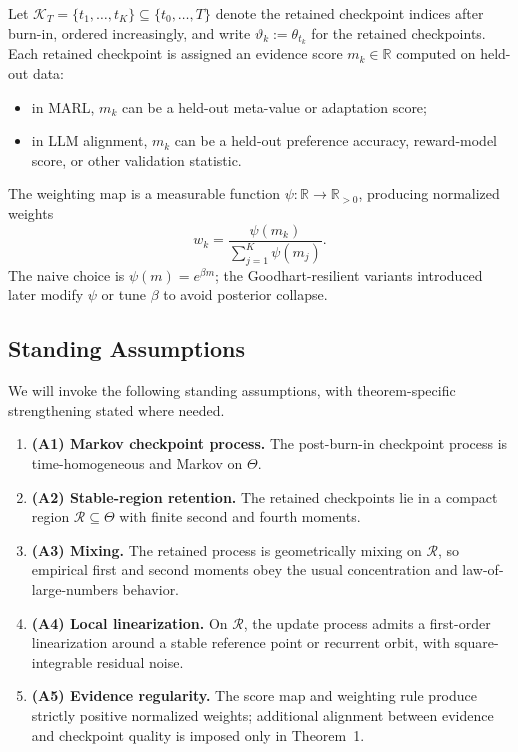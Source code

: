 \documentclass[10pt]{article}
\theoremstyle{plain}
\theoremstyle{definition}
\theoremstyle{remark}
\begin{document}
Let $\mathcal{K}_T = \{t_1,\dots,t_K\} \subseteq \{t_0,\dots,T\}$ denote the retained checkpoint indices after burn-in, ordered increasingly, and write $\vartheta_k := \theta_{t_k}$ for the retained checkpoints. Each retained checkpoint is assigned an evidence score $m_k \in \mathbb{R}$ computed on held-out data:
\begin{itemize}[leftmargin=1.5em]
  \item in MARL, $m_k$ can be a held-out meta-value or adaptation score;
  \item in LLM alignment, $m_k$ can be a held-out preference accuracy, reward-model score, or other validation statistic.
\end{itemize}
The weighting map is a measurable function $\psi : \mathbb{R} \to \mathbb{R}_{>0}$, producing normalized weights
\begin{equation}
w_k = \frac{\psi(m_k)}{\sum_{j=1}^K \psi(m_j)}.
\end{equation}
The naive choice is $\psi(m)=e^{\beta m}$; the Goodhart-resilient variants introduced later modify $\psi$ or tune $\beta$ to avoid posterior collapse.

\subsection{Standing Assumptions}

We will invoke the following standing assumptions, with theorem-specific strengthening stated where needed.
\begin{enumerate}[leftmargin=1.5em, itemsep=0.25em]
  \item \textbf{(A1) Markov checkpoint process.} The post-burn-in checkpoint process is time-homogeneous and Markov on $\Theta$.
  \item \textbf{(A2) Stable-region retention.} The retained checkpoints lie in a compact region $\mathcal{R} \subseteq \Theta$ with finite second and fourth moments.
  \item \textbf{(A3) Mixing.} The retained process is geometrically mixing on $\mathcal{R}$, so empirical first and second moments obey the usual concentration and law-of-large-numbers behavior.
  \item \textbf{(A4) Local linearization.} On $\mathcal{R}$, the update process admits a first-order linearization around a stable reference point or recurrent orbit, with square-integrable residual noise.
  \item \textbf{(A5) Evidence regularity.} The score map and weighting rule produce strictly positive normalized weights; additional alignment between evidence and checkpoint quality is imposed only in Theorem~1.
\end{enumerate}
\end{document}
